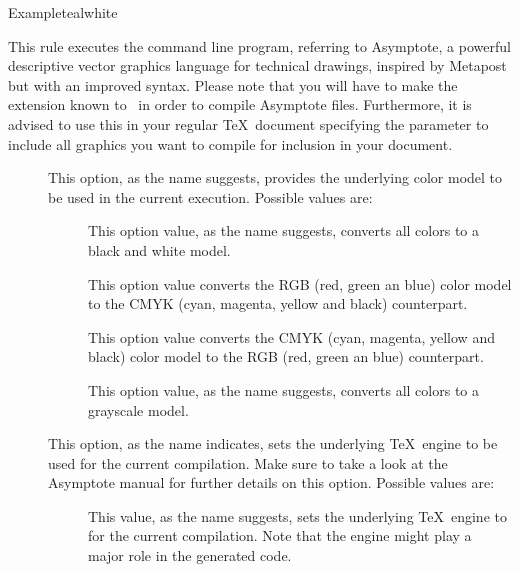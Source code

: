 \begin{description}
\begin{codebox}{Example}{teal}{\icnote}{white}
\end{codebox}

\item[\rulebox{asymptote}]
This rule executes the  command line program, referring to Asymptote, a powerful descriptive vector graphics language for technical drawings, inspired by Metapost but with an improved syntax. Please note that you will have to make the  extension known to \arara\ in order to compile Asymptote files. Furthermore, it is advised to use this in your regular \TeX\ document specifying the  parameter to include all graphics you want to compile for inclusion in your document.

\begin{description}
\item[] This option, as the name suggests, provides the underlying color model to be used in the current execution. Possible values are:

\begin{description}
\item[] This option value, as the name suggests, converts all colors to a black and white model.

\item[] This option value converts the RGB (red, green an blue) color model to the CMYK (cyan, magenta, yellow and black) counterpart.

\item[] This option value converts the CMYK (cyan, magenta, yellow and black)  color model to the RGB (red, green an blue) counterpart.

\item[] This option value, as the name suggests, converts all colors to a grayscale model.
\end{description}

\item[] This option, as the name indicates, sets the underlying \TeX\ engine to be used for the current compilation. Make sure to take a look at the Asymptote manual for further details on this option. Possible values are:

\begin{description}
\item[] This value, as the name suggests, sets the underlying \TeX\ engine to  for the current compilation. Note that the engine might play a major role in the generated code.


\end{description}
\end{description}
\end{description}
